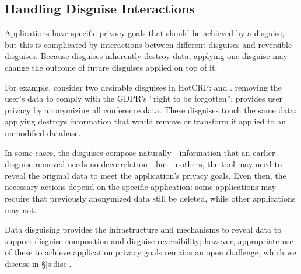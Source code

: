 \subsection{Handling Disguise Interactions}

Applications have specific privacy goals that should be achieved by a disguise,
but this is complicated by interactions between different disguises and reversible disguises.
%
Because disguises inherently destroy data, applying one disguise may change the outcome of future
disguises applied on top of it.

For example, consider two desirable disguises in HotCRP: \gdpr and \ca.
%
\gdpr removing the user's data to comply with the GDPR's ``right to be forgotten''; \ca provides
user privacy by anonymizing all conference data.
%
These disguises touch the same data: applying \ca destroys information that \gdpr would remove
or transform if applied to an unmodified database.
%

%
In some cases, the disguises compose naturally---\eg information that an earlier disguise removed
needs no decorrelation---but in others, the tool may need to reveal the original data to meet the
application's privacy goals. Even then, the necessary actions depend on the specific application:
some applications may require that previously anonymized data still be deleted, while other
applications may not.
%

Data disguising provides the infrastructure and mechanisms to reveal data to support 
disguise composition and disguise reversibility; however, appropriate use of these to
achieve application privacy goals remains an open challenge, which we discuss in \S\ref{s:disc}.


